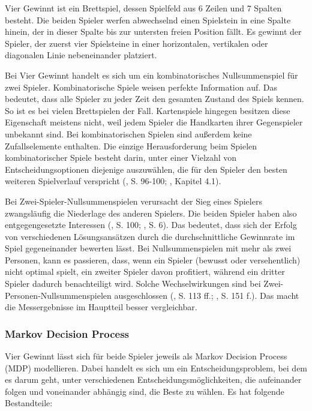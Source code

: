 \label{vier-gewinnt}

Vier Gewinnt ist ein Brettspiel, dessen Spielfeld aus 6 Zeilen und 7 Spalten besteht. Die beiden Spieler werfen abwechselnd einen Spielstein in eine Spalte hinein, der in dieser Spalte bis zur untersten freien Position fällt. Es gewinnt der Spieler, der zuerst vier Spielsteine in einer horizontalen, vertikalen oder diagonalen Linie nebeneinander platziert\cite{MiltonBradleyCompany.1990}.

Bei Vier Gewinnt handelt es sich um ein kombinatorisches Nullsummenspiel für zwei Spieler. Kombinatorische Spiele weisen \glqq perfekte Information\grqq{} auf. Das bedeutet, dass alle Spieler zu jeder Zeit den gesamten Zustand des Spiels kennen. So ist es bei vielen Brettspielen der Fall. Kartenspiele hingegen besitzen diese Eigenschaft meistens nicht, weil jedem Spieler die Handkarten ihrer Gegenspieler unbekannt sind. Bei kombinatorischen Spielen sind außerdem keine Zufallselemente enthalten. Die einzige Herausforderung beim Spielen kombinatorischer Spiele besteht darin, unter einer Vielzahl von Entscheidungsoptionen diejenige auszuwählen, die für den Spieler den besten weiteren Spielverlauf verspricht (\cite{Bewersdorff.2018}, S. 96-100; \cite{Ferguson.January2019}, Kapitel 4.1).

Bei Zwei-Spieler-Nullsummenspielen verursacht der Sieg eines Spielers zwangsläufig die Niederlage des anderen Spielers. Die beiden Spieler haben also entgegengesetzte Interessen (\cite{Bewersdorff.2018}, S. 100; \cite{Allis.1994}, S. 6). Das bedeutet, dass sich der Erfolg von verschiedenen Lösungsansätzen durch die durchschnittliche Gewinnrate im Spiel gegeneinander bewerten lässt. Bei Nullsummenspielen mit mehr als zwei Personen, kann es passieren, dass, wenn ein Spieler (bewusst oder versehentlich) nicht optimal spielt, ein zweiter Spieler davon profitiert, während ein dritter Spieler dadurch benachteiligt wird. Solche Wechselwirkungen sind bei Zwei-Personen-Nullsummenspielen ausgeschlossen (\cite{Bewersdorff.2018}, S. 113 ff.; \cite{Russell.2020}, S. 151 f.). Das macht die Messergebnisse im Hauptteil besser vergleichbar.

\subsubsection{Markov Decision Process}

Vier Gewinnt lässt sich für beide Spieler jeweils als Markov Decision Process (MDP) modellieren. Dabei handelt es sich um ein Entscheidungsproblem, bei dem es darum geht, unter verschiedenen Entscheidungsmöglichkeiten, die aufeinander folgen und voneinander abhängig sind, die Beste zu wählen. Es hat folgende Bestandteile:

